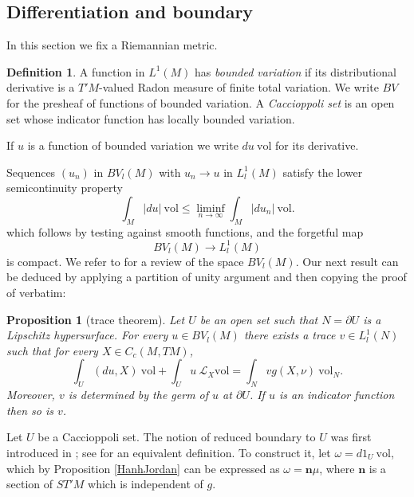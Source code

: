 \documentclass[reqno,12pt,letterpaper]{amsart}
\newcommand{\normal}{\mathbf n}
\newcommand{\vol}{\mathrm{vol}}
\newcommand{\dfn}[1]{\emph{#1}\index{#1}}
\newtheorem{proposition}[theorem]{Proposition}
\theoremstyle{definition}
\newtheorem{definition}[theorem]{Definition}
\numberwithin{equation}{section}
\begin{document}
\subsection{Differentiation and boundary}
In this section we fix a Riemannian metric.

\begin{definition}
A function in $L^1(M)$ has \dfn{bounded variation} if its distributional derivative is a $T'M$-valued Radon measure of finite total variation.
We write $BV$ for the presheaf of functions of bounded variation.
A \dfn{Caccioppoli set} is an open set whose indicator function has locally bounded variation.
\end{definition}

If $u$ is a function of bounded variation we write $du ~\vol$ for its derivative.

Sequences $(u_n)$ in $BV_l(M)$ with $u_n \to u$ in $L^1_l(M)$ satisfy the lower semicontinuity property
\begin{equation}
\label{RieszMarkovDistr}
\int_M |du| ~\vol \leq \liminf_{n \to \infty} \int_M |du_n| ~\vol.
\end{equation}
which follows by testing against smooth functions, and the forgetful map
\begin{equation}\label{Forget}
BV_l(M) \to L^1_l(M)
\end{equation}
is compact. We refer to \cite[Chapter 1]{Giusti77} for a review of the space $BV_l(M)$.
Our next result can be deduced by applying a partition of unity argument and then copying the proof of \cite[Teorema 1]{Miranda67} verbatim:

\begin{proposition}[trace theorem]\label{traces}
Let $U$ be an open set such that $N = \partial U$ is a Lipschitz hypersurface.
For every $u \in BV_l(M)$ there exists a trace $v \in L^1_l(N)$ such that for every $X \in C_c(M, TM)$,
\begin{equation}\label{Miranda IBP}
\int_U (du, X) ~\vol + \int_U u ~\mathcal L_X\vol = \int_N vg(X, \nu) ~\vol_N.
\end{equation}
Moreover, $v$ is determined by the germ of $u$ at $\partial U$.
If $u$ is an indicator function then so is $v$.
\end{proposition}

Let $U$ be a Caccioppoli set.
The notion of reduced boundary to $U$ was first introduced in \cite{deGiorgi55}; see \cite{Battista_2021} for an equivalent definition.
To construct it, let $\omega = d1_U ~\vol$, which by Proposition \ref{HanhJordan} can be expressed as $\omega = \normal \mu$, where $\normal$ is a section of $ST'M$ which is independent of $g$.
\end{document}
